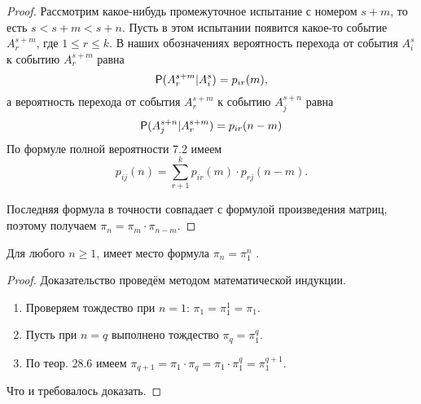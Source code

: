 \begin{proof}
Рассмотрим какое-нибудь промежуточное испытание с номером $s + m$, то есть $s < s + m < s + n$. Пусть в этом испытании появится какое-то событие $A^{s+m}_r$, где $1 \leq r \leq k$. В наших обозначениях вероятность перехода от события $A^s_i$ к событию $A^{s+m}_r$ равна
$$\P(A^{s+m}_r|A^s_i) = p_{ir}(m),$$
а вероятность перехода от события $A^{s+m}_r$ к событию $A^{s+n}_j$ равна
$$\P(A^{s+n}_j|A^{s+m}_r) = p_{ir}(n-m)$$
По формуле полной вероятности 7.2 имеем
$$p_{ij}(n) = \sum\limits_{r+1}^k p_{ir}(m) \cdot p_{rj}(n-m).$$

Последняя формула в точности совпадает с формулой произведения матриц, поэтому получаем $\pi_n = \pi_m \cdot \pi_{n−m} .$
\end{proof} 

\begin{theorem}
 	Для любого $n \geq 1$, имеет место формула $\pi_n = \pi_1^n$ .
 \end{theorem} 

\begin{proof}
Доказательство проведём методом математической индукции.
\begin{enumerate}
	\item Проверяем тождество при $n = 1$: $\pi_1 = \pi^1_1 = \pi_1$.
	\item Пусть при $n = q$ выполнено тождество $\pi_q = \pi_1^q .$
	\item По теор. 28.6 имеем $\pi_{q+1} = \pi_1 \cdot \pi_q = \pi_1 \cdot \pi_1^q = \pi_1^{q+1}$.
\end{enumerate}
Что и требовалось доказать.
\end{proof}